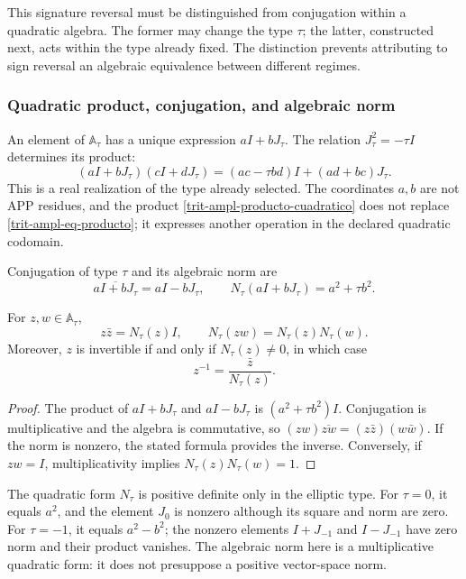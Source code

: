 This signature reversal must be distinguished from conjugation within a
quadratic algebra. The former may change the type \(\tau\); the latter,
constructed next, acts within the type already fixed. The
distinction prevents attributing to sign reversal an algebraic
equivalence between different regimes.

\subsubsection{Quadratic product, conjugation, and algebraic norm}
\label{trit-ampl-norma}

An element of \(\mathbb A_\tau\) has a unique expression \(aI+bJ_\tau\).
The relation \(J_\tau^2=-\tau I\) determines its product:
\begin{equation}
 (aI+bJ_\tau)(cI+dJ_\tau)
   =(ac-\tau bd)I+(ad+bc)J_\tau.
 \label{trit-ampl-producto-cuadratico}
\end{equation}
This is a real realization of the type already selected. The coordinates
\(a,b\) are not APP residues, and the product
\eqref{trit-ampl-producto-cuadratico} does not replace
\eqref{trit-ampl-eq-producto}; it expresses another operation in the declared
quadratic codomain.

\begin{definition}
\label{trit-ampl-def-norma}
Conjugation of type \(\tau\) and its algebraic norm are
\[
 \overline{aI+bJ_\tau}=aI-bJ_\tau,\qquad
 N_\tau(aI+bJ_\tau)=a^2+\tau b^2.
\]
\end{definition}

\begin{proposition}
\label{trit-ampl-prop-norma}
For \(z,w\in\mathbb A_\tau\),
\[
 z\bar z=N_\tau(z)I,\qquad
 N_\tau(zw)=N_\tau(z)N_\tau(w).
\]
Moreover, \(z\) is invertible if and only if \(N_\tau(z)\ne0\), in which case
\[
 z^{-1}=\frac{\bar z}{N_\tau(z)}.
\]
\end{proposition}
\begin{proof}
The product of \(aI+bJ_\tau\) and \(aI-bJ_\tau\) is
\((a^2+\tau b^2)I\). Conjugation is multiplicative and the algebra is
commutative, so
\((zw)\overline{zw}=(z\bar z)(w\bar w)\). If the norm is nonzero, the
stated formula provides the inverse. Conversely, if \(zw=I\),
multiplicativity implies \(N_\tau(z)N_\tau(w)=1\).
\end{proof}

The quadratic form \(N_\tau\) is positive definite only in the elliptic type.
For \(\tau=0\), it equals \(a^2\), and the element \(J_0\) is nonzero although its
square and norm are zero. For \(\tau=-1\), it equals \(a^2-b^2\); the
nonzero elements \(I+J_{-1}\) and \(I-J_{-1}\) have zero norm and their
product vanishes. The algebraic norm here is a multiplicative quadratic
form: it does not presuppose a positive vector-space norm.

